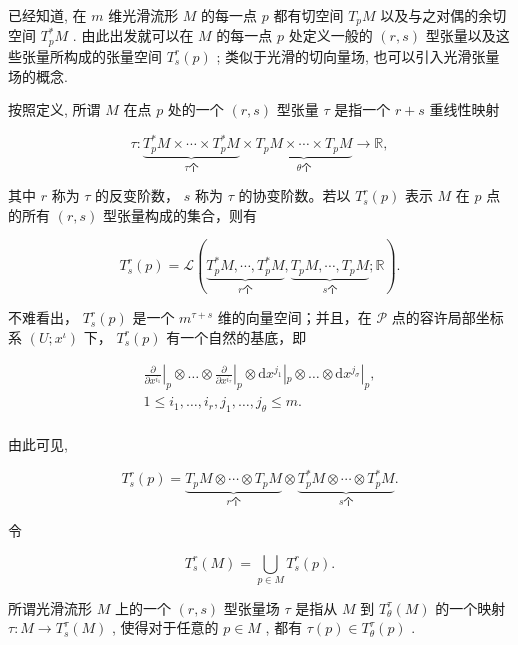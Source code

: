 已经知道, 在  $m$  维光滑流形  $M$  的每一点  $p$  都有切空间  $T_{p}M$  以及与之对偶的余切空间  $T_{p}^{*}M$ . 由此出发就可以在  $M$  的每一点  $p$  处定义一般的  $(r, s)$  型张量以及这些张量所构成的张量空间  $T_{s}^{r}(p)$ ; 类似于光滑的切向量场, 也可以引入光滑张量场的概念.

按照定义, 所谓  $M$  在点  $p$  处的一个  $(r,s)$  型张量  $\tau$  是指一个  $r + s$  重线性映射

$$
\tau : \underbrace {T _ {p} ^ {*} M \times \cdots \times T _ {p} ^ {*} M} _ {\tau \text {个}} \times \underbrace {T _ {p} M \times \cdots \times T _ {p} M} _ {\theta \text {个}} \to \mathbb {R},
$$

其中  $r$  称为  $\tau$  的反变阶数， $s$  称为  $\tau$  的协变阶数。若以  $T_{s}^{r}(p)$  表示  $M$  在  $p$  点的所有  $(r, s)$  型张量构成的集合，则有

$$
T _ {s} ^ {r} (p) = \mathcal {L} (\underbrace {T _ {p} ^ {*} M , \cdots , T _ {p} ^ {*} M} _ {r \text {个}}, \underbrace {T _ {p} M , \cdots , T _ {p} M} _ {s \text {个}}; \mathbb {R}).
$$

不难看出，  $T_{s}^{r}(p)$  是一个  $m^{\tau + s}$  维的向量空间；并且，在  $\mathcal{P}$  点的容许局部坐标系  $(U; x^{\iota})$  下，  $T_{s}^{r}(p)$  有一个自然的基底，即

$$
\begin{array}{l} \left. \frac {\partial}{\partial x ^ {i _ {1}}} \right| _ {p} \otimes \dots \otimes \left. \frac {\partial}{\partial x ^ {i _ {\tau}}} \right| _ {p} \otimes \mathrm {d} x ^ {j _ {1}} | _ {p} \otimes \dots \otimes \mathrm {d} x ^ {j _ {\sigma}} | _ {p}, \\ 1 \leqslant i _ {1}, \dots , i _ {r}, j _ {1}, \dots , j _ {\theta} \leqslant m. \\ \end{array}
$$

由此可见,

$$
T _ {s} ^ {r} (p) = \underbrace {T _ {p} M \otimes \cdots \otimes T _ {p} M} _ {r   \text {个}} \otimes \underbrace {T _ {p} ^ {*} M \otimes \cdots \otimes T _ {p} ^ {*} M} _ {s   \text {个}}.
$$

令

$$
T _ {s} ^ {r} (M) = \bigcup_ {p \in M} T _ {s} ^ {r} (p).
$$

所谓光滑流形  $M$  上的一个  $(r,s)$  型张量场  $\tau$  是指从  $M$  到  $T_{\theta}^{\tau}(M)$  的一个映射  $\tau : M \to T_{s}^{\tau}(M)$ , 使得对于任意的  $p \in M$ , 都有  $\tau(p) \in T_{\theta}^{\tau}(p)$ .

